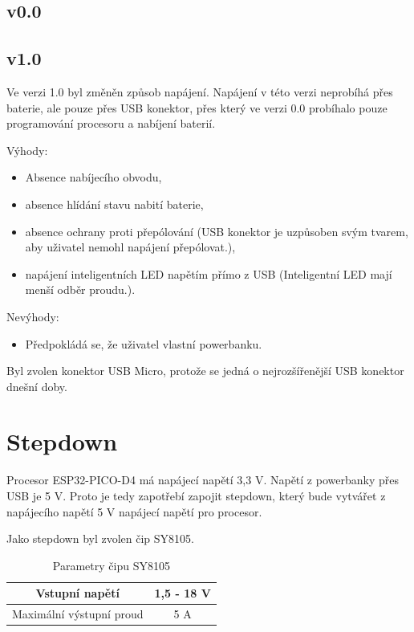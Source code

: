   \subsection{v0.0}
  \subsection{v1.0}
  Ve verzi 1.0 byl změněn způsob napájení. Napájení v této verzi neprobíhá přes baterie, ale pouze přes USB konektor, přes 
  který ve verzi 0.0 probíhalo pouze programování procesoru a nabíjení baterií. 

  Výhody:
  \begin{itemize}
    \item Absence nabíjecího obvodu,
    \item absence hlídání stavu nabití baterie,
    \item absence ochrany proti přepólování (USB konektor je uzpůsoben svým tvarem, aby uživatel nemohl napájení přepólovat.),
    \item napájení inteligentních LED napětím přímo z USB (Inteligentní LED mají menší odběr proudu.).
  \end{itemize}

  Nevýhody:
  \begin{itemize}
    \item Předpokládá se, že uživatel vlastní powerbanku.%
  \end{itemize}

  Byl zvolen konektor USB Micro, protože se jedná o nejrozšířenější USB konektor dnešní doby.

  \section{Stepdown}
  Procesor ESP32-PICO-D4 má napájecí napětí 3,3 V. Napětí z powerbanky přes USB je 5 V. Proto je tedy zapotřebí zapojit 
  stepdown, který bude vytvářet z napájecího napětí 5 V napájecí napětí pro procesor.

  Jako stepdown byl zvolen čip SY8105.

  \begin{table}[!h]
    \caption{Parametry čipu SY8105 \cite{SY8105_datasheet}}
    \begin{center}
        \begin{tabular}{|c|c|}
            \hline
            Vstupní napětí             & 1,5 - 18 V \\
            \hline
            Maximální výstupní proud   & 5 A \\
            \hline
        \end{tabular}    
    \end{center}
\end{table}

